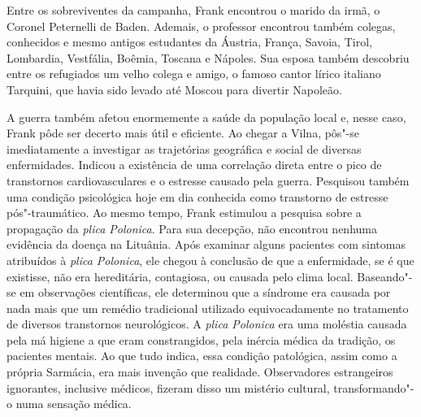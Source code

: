 Entre os sobreviventes da campanha, Frank encontrou o marido da irmã, o
Coronel Peternelli de Baden. Ademais, o professor encontrou também
colegas, conhecidos e mesmo antigos estudantes da Áustria, França,
Savoia, Tirol, Lombardia, Vestfália, Boêmia, Toscana e Nápoles. Sua
esposa também descobriu entre os refugiados um velho colega e amigo, o
famoso cantor lírico italiano Tarquini, que havia sido levado até Moscou
para divertir Napoleão.

A guerra também afetou enormemente a saúde da população local e, nesse
caso, Frank pôde ser decerto mais útil e eficiente. Ao chegar a Vilna,
pôs"-se imediatamente a investigar as trajetórias geográfica e social de
diversas enfermidades. Indicou a existência de uma correlação direta
entre o pico de transtornos cardiovasculares e o estresse causado pela
guerra. Pesquisou também uma condição psicológica hoje em dia conhecida
como transtorno de estresse pós"-traumático. Ao mesmo tempo, Frank
estimulou a pesquisa sobre a propagação da \textit{plica Polonica}. Para
sua decepção, não encontrou nenhuma evidência da doença na Lituânia.
Após examinar alguns pacientes com sintomas atribuídos à \textit{plica
Polonica}, ele chegou à conclusão de que a enfermidade, se é que
existisse, não era hereditária, contagiosa, ou causada pelo clima local.
Baseando"-se em observações científicas, ele determinou que a síndrome
era causada por nada mais que um remédio tradicional utilizado
equivocadamente no tratamento de diversos transtornos neurológicos. A
\textit{plica Polonica} era uma moléstia causada pela má higiene a que
eram constrangidos, pela inércia médica da tradição, os pacientes
mentais. Ao que tudo indica, essa condição patológica, assim como a
própria Sarmácia, era mais invenção que realidade. Observadores
estrangeiros ignorantes, inclusive médicos, fizeram disso um mistério
cultural, transformando"-o numa sensação médica.

